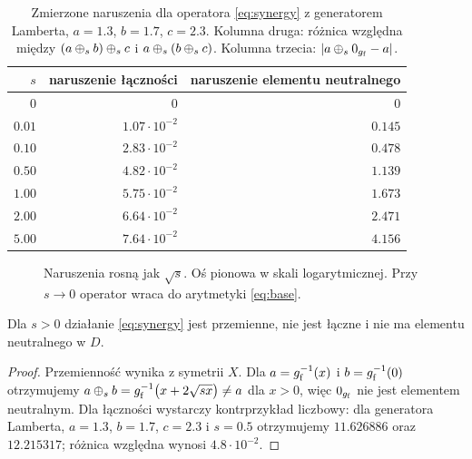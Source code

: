 \documentclass[11pt,a4paper]{article}
\begin{document}
\begin{table}[t]
\centering
\small
\caption{Zmierzone naruszenia dla operatora \eqref{eq:synergy} z generatorem
Lamberta, $a=1.3$, $b=1.7$, $c=2.3$. Kolumna druga: różnica względna między
$(a\mathbin{\oplus}_s b)\mathbin{\oplus}_s c$ i $a\mathbin{\oplus}_s(b\mathbin{\oplus}_s c)$. Kolumna trzecia:
$|a\mathbin{\oplus}_s 0_{g_{\mathrm{f}}}-a|$.}
\label{tab:synergy}
\begin{tabular}{@{}rrr@{}}
\toprule
$s$ & naruszenie łączności & naruszenie elementu neutralnego \\
\midrule
$0$     & $0$            & $0$ \\
$0.01$  & $1.07\cdot10^{-2}$ & $0.145$ \\
$0.10$  & $2.83\cdot10^{-2}$ & $0.478$ \\
$0.50$  & $4.82\cdot10^{-2}$ & $1.139$ \\
$1.00$  & $5.75\cdot10^{-2}$ & $1.673$ \\
$2.00$  & $6.64\cdot10^{-2}$ & $2.471$ \\
$5.00$  & $7.64\cdot10^{-2}$ & $4.156$ \\
\bottomrule
\end{tabular}
\end{table}

\begin{figure}[t]
\centering
{}
\caption{Naruszenia rosną jak $\sqrt{s}$. Oś pionowa w skali logarytmicznej.
Przy $s\to0$ operator wraca do arytmetyki \eqref{eq:base}.}
\label{fig:synergy}
\end{figure}

\begin{proposition}
\label{prop:synergy}
Dla $s>0$ działanie \eqref{eq:synergy} jest przemienne, nie jest łączne i nie
ma elementu neutralnego w $D$.
\end{proposition}

\begin{proof}
Przemienność wynika z symetrii $X$. Dla $a=g_{\mathrm{f}}^{-1}(x)$ i $b=g_{\mathrm{f}}^{-1}(0)$
otrzymujemy $a\mathbin{\oplus}_{s}b=g_{\mathrm{f}}^{-1}\big(x+2\sqrt{sx}\big)\neq a$ dla $x>0$, więc
$0_{g_{\mathrm{f}}}$ nie jest elementem neutralnym. Dla łączności wystarczy kontrprzykład
liczbowy: dla generatora Lamberta, $a=1.3$, $b=1.7$, $c=2.3$ i $s=0.5$
otrzymujemy $11.626886$ oraz $12.215317$; różnica względna wynosi
$4.8\cdot10^{-2}$.
\end{proof}
\end{document}
